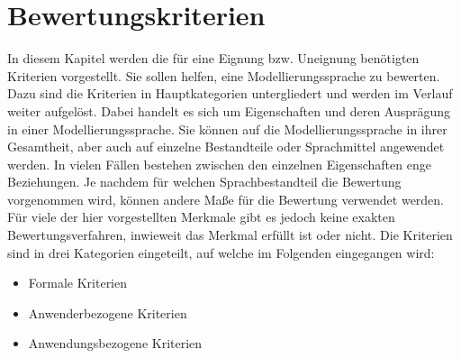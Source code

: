 

\chapter{Bewertungskriterien}
\label{ch:Bewertungskriterien}
In diesem Kapitel werden die für eine Eignung bzw. Uneignung benötigten Kriterien vorgestellt.
Sie sollen helfen, eine Modellierungssprache zu bewerten. Dazu sind die Kriterien in Hauptkategorien untergliedert und werden im Verlauf weiter aufgelöst. 
Dabei handelt es sich um Eigenschaften und deren Ausprägung in einer Modellierungssprache.
Sie können auf die Modellierungssprache in ihrer Gesamtheit, aber auch auf einzelne Bestandteile oder Sprachmittel angewendet werden.
In vielen Fällen bestehen zwischen den einzelnen Eigenschaften enge Beziehungen.
Je nachdem für welchen Sprachbestandteil die Bewertung vorgenommen wird, können andere Maße für die Bewertung verwendet werden.
Für viele der hier vorgestellten Merkmale gibt es jedoch keine exakten Bewertungsverfahren, inwieweit das Merkmal erfüllt ist oder nicht.
Die Kriterien sind in drei Kategorien eingeteilt, auf welche im Folgenden eingegangen wird:

\begin{itemize}
	\item Formale Kriterien
	\item Anwenderbezogene Kriterien
	\item Anwendungsbezogene Kriterien
\end{itemize}






